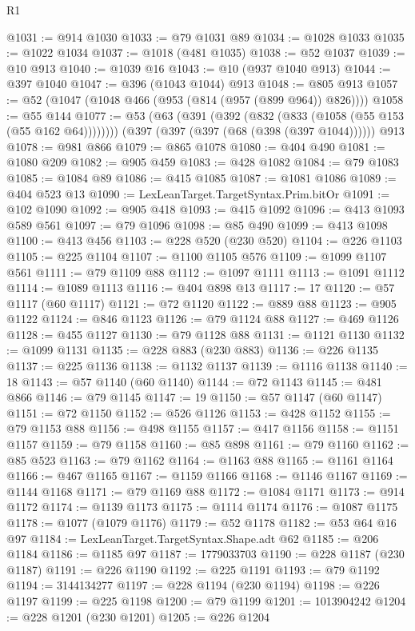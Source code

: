 \begin{lexlean}{R1}
\begin{coremodule}
@1031 := @914 @1030
@1033 := @79 @1031 @89
@1034 := @1028 @1033
@1035 := @1022 @1034
@1037 := @1018 (@481 @1035)
@1038 := @52 @1037
@1039 := @10 @913
@1040 := @1039 @16
@1043 := @10 (@937 @1040 @913)
@1044 := @397 @1040
@1047 := @396 (@1043 @1044) @913
@1048 := @805 @913
@1057 := @52 (@1047 (@1048 @466 (@953 (@814 (@957 (@899 @964)) @826))))
@1058 := @55 @144
@1077 := @53
    (@63 (@391 (@392 (@832 (@833 (@1058 (@55 @153 (@55 @162 @64))))))))
    (@397 (@397 (@397 (@68 (@398 (@397 @1044))))))
    @913
@1078 := @981 @866
@1079 := @865 @1078
@1080 := @404 @490
@1081 := @1080 @209
@1082 := @905 @459
@1083 := @428 @1082
@1084 := @79 @1083
@1085 := @1084 @89
@1086 := @415 @1085
@1087 := @1081 @1086
@1089 := @404 @523 @13
@1090 := LexLeanTarget.TargetSyntax.Prim.bitOr
@1091 := @102 @1090
@1092 := @905 @418
@1093 := @415 @1092
@1096 := @413 @1093 @589 @561
@1097 := @79 @1096
@1098 := @85 @490
@1099 := @413 @1098
@1100 := @413 @456
@1103 := @228 @520 (@230 @520)
@1104 := @226 @1103
@1105 := @225 @1104
@1107 := @1100 @1105 @576
@1109 := @1099 @1107 @561
@1111 := @79 @1109 @88
@1112 := @1097 @1111
@1113 := @1091 @1112
@1114 := @1089 @1113
@1116 := @404 @898 @13
@1117 := 17
@1120 := @57 @1117 (@60 @1117)
@1121 := @72 @1120
@1122 := @889 @88
@1123 := @905 @1122
@1124 := @846 @1123
@1126 := @79 @1124 @88
@1127 := @469 @1126
@1128 := @455 @1127
@1130 := @79 @1128 @88
@1131 := @1121 @1130
@1132 := @1099 @1131
@1135 := @228 @883 (@230 @883)
@1136 := @226 @1135
@1137 := @225 @1136
@1138 := @1132 @1137
@1139 := @1116 @1138
@1140 := 18
@1143 := @57 @1140 (@60 @1140)
@1144 := @72 @1143
@1145 := @481 @866
@1146 := @79 @1145
@1147 := 19
@1150 := @57 @1147 (@60 @1147)
@1151 := @72 @1150
@1152 := @526 @1126
@1153 := @428 @1152
@1155 := @79 @1153 @88
@1156 := @498 @1155
@1157 := @417 @1156
@1158 := @1151 @1157
@1159 := @79 @1158
@1160 := @85 @898
@1161 := @79 @1160
@1162 := @85 @523
@1163 := @79 @1162
@1164 := @1163 @88
@1165 := @1161 @1164
@1166 := @467 @1165
@1167 := @1159 @1166
@1168 := @1146 @1167
@1169 := @1144 @1168
@1171 := @79 @1169 @88
@1172 := @1084 @1171
@1173 := @914 @1172
@1174 := @1139 @1173
@1175 := @1114 @1174
@1176 := @1087 @1175
@1178 := @1077 (@1079 @1176)
@1179 := @52 @1178
@1182 := @53 @64 @16 @97
@1184 := LexLeanTarget.TargetSyntax.Shape.adt @62
@1185 := @206 @1184
@1186 := @1185 @97
@1187 := 1779033703
@1190 := @228 @1187 (@230 @1187)
@1191 := @226 @1190
@1192 := @225 @1191
@1193 := @79 @1192
@1194 := 3144134277
@1197 := @228 @1194 (@230 @1194)
@1198 := @226 @1197
@1199 := @225 @1198
@1200 := @79 @1199
@1201 := 1013904242
@1204 := @228 @1201 (@230 @1201)
@1205 := @226 @1204

\end{coremodule}
\end{lexlean}
